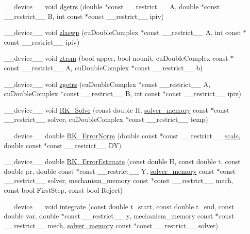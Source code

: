 \begin{DoxyCompactItemize}
\item 
\+\_\+\+\_\+device\+\_\+\+\_\+ void \hyperlink{radau2a_8cu_af739b5c0f82fc708026babff87a2853b}{dgetrs} (double $\ast$const \+\_\+\+\_\+restrict\+\_\+\+\_\+ A, double $\ast$const \+\_\+\+\_\+restrict\+\_\+\+\_\+ B, int const $\ast$const \+\_\+\+\_\+restrict\+\_\+\+\_\+ ipiv)
\item 
\+\_\+\+\_\+device\+\_\+\+\_\+ void \hyperlink{radau2a_8cu_a6b91937bd4502e4508486bdcf23a8291}{zlaswp} (cu\+Double\+Complex $\ast$const \+\_\+\+\_\+restrict\+\_\+\+\_\+ A, int const $\ast$const \+\_\+\+\_\+restrict\+\_\+\+\_\+ ipiv)
\item 
\+\_\+\+\_\+device\+\_\+\+\_\+ void \hyperlink{radau2a_8cu_a6dc4374e351f792988fe9a880b9262eb}{ztrsm} (bool upper, bool nounit, cu\+Double\+Complex const $\ast$const \+\_\+\+\_\+restrict\+\_\+\+\_\+ A, cu\+Double\+Complex $\ast$const \+\_\+\+\_\+restrict\+\_\+\+\_\+ b)
\item 
\+\_\+\+\_\+device\+\_\+\+\_\+ void \hyperlink{radau2a_8cu_a78d590ae02cdd238f47f5f3060235d90}{zgetrs} (cu\+Double\+Complex $\ast$const \+\_\+\+\_\+restrict\+\_\+\+\_\+ A, cu\+Double\+Complex $\ast$const \+\_\+\+\_\+restrict\+\_\+\+\_\+ B, int const $\ast$const \+\_\+\+\_\+restrict\+\_\+\+\_\+ ipiv)
\item 
\+\_\+\+\_\+device\+\_\+\+\_\+ void \hyperlink{radau2a_8cu_a8a29dabf1d9ad69f2707d575ffc9f9d3}{R\+K\+\_\+\+Solve} (const double H, \hyperlink{structsolver__memory}{solver\+\_\+memory} const $\ast$const \+\_\+\+\_\+restrict\+\_\+\+\_\+ solver, cu\+Double\+Complex $\ast$const \+\_\+\+\_\+restrict\+\_\+\+\_\+ temp)
\item 
\+\_\+\+\_\+device\+\_\+\+\_\+ double \hyperlink{radau2a_8cu_a52a2afa4e1728f2fb5116ae0c6315568}{R\+K\+\_\+\+Error\+Norm} (double const $\ast$const \+\_\+\+\_\+restrict\+\_\+\+\_\+ \hyperlink{radau2a_8cu_a4fab5866449108992478041d2e51a28c}{scale}, double const $\ast$const \+\_\+\+\_\+restrict\+\_\+\+\_\+ DY)
\item 
\+\_\+\+\_\+device\+\_\+\+\_\+ double \hyperlink{radau2a_8cu_a4b85075dc35ca99e0b06672bb1215ec9}{R\+K\+\_\+\+Error\+Estimate} (const double H, const double t, const double pr, double const $\ast$const \+\_\+\+\_\+restrict\+\_\+\+\_\+ Y, \hyperlink{structsolver__memory}{solver\+\_\+memory} const $\ast$const \+\_\+\+\_\+restrict\+\_\+\+\_\+ solver, mechanism\+\_\+memory const $\ast$const \+\_\+\+\_\+restrict\+\_\+\+\_\+ mech, const bool First\+Step, const bool Reject)
\item 
\+\_\+\+\_\+device\+\_\+\+\_\+ void \hyperlink{radau2a_8cu_a0a715eaa118190c4303b137d1a634470}{integrate} (const double t\+\_\+start, const double t\+\_\+end, const double var, double $\ast$const \+\_\+\+\_\+restrict\+\_\+\+\_\+ y, mechanism\+\_\+memory const $\ast$const \+\_\+\+\_\+restrict\+\_\+\+\_\+ mech, \hyperlink{structsolver__memory}{solver\+\_\+memory} const $\ast$const \+\_\+\+\_\+restrict\+\_\+\+\_\+ solver)
\end{DoxyCompactItemize}

